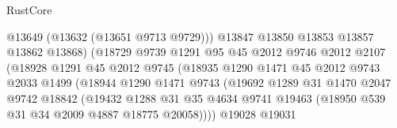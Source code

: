 \begin{lexlean}{RustCore}
\begin{coremodule}
                                          @13649
                                          (@13632 (@13651 @9713 @9729)))
                                        @13847
                                        @13850
                                        @13853
                                        @13857
                                        @13862
                                        @13868)
                                      (@18729
                                        @9739
                                        @1291
                                        @95
                                        @45
                                        @2012
                                        @9746
                                        @2012
                                        @2107
                                        (@18928
                                          @1291
                                          @45
                                          @2012
                                          @9745
                                          (@18935
                                            @1290
                                            @1471
                                            @45
                                            @2012
                                            @9743
                                            @2033
                                            @1499
                                            (@18944
                                              @1290
                                              @1471
                                              @9743
                                              (@19692
                                                @1289
                                                @31
                                                @1470
                                                @2047
                                                @9742
                                                @18842
                                                (@19432
                                                  @1288
                                                  @31
                                                  @35
                                                  @4634
                                                  @9741
                                                  @19463
                                                  (@18950 @539 @31 @34 @2009 @4887 @18775 @20058))))
                                            @19028
                                            @19031

\end{coremodule}
\end{lexlean}
